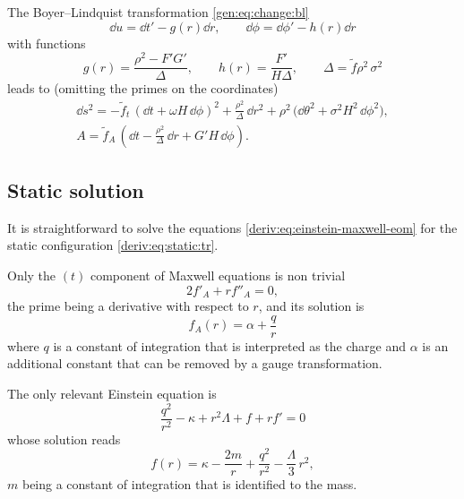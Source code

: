 The Boyer--Lindquist transformation \eqref{gen:eq:change:bl}
\begin{equation}
	\dd u = \dd t' - g(r) \dd r, \qquad
	\dd \phi = \dd \phi' - h(r) \dd r
\end{equation} 
with functions
\begin{equation}
	g(r) = \frac{\rho^2 - F' G'}{\Delta}, \qquad
	h(r) = \frac{F'}{H \Delta}, \qquad
	\Delta = \tilde f \rho^2\, \sigma^2
\end{equation} 
leads to (omitting the primes on the coordinates)
\begin{subequations}
\label{deriv:eq:rotating:tr}
\begin{gather}
	\dd s^2 = - \tilde f_t\, (\dd t + \omega H\, \dd\phi )^2
		+ \frac{\rho^2}{\Delta}\, \dd r^2
		+ \rho^2\, \big(\dd\theta^2 + \sigma^2 H^2\, \dd\phi^2 \big), \\
	A = \tilde f_A\, \left(\dd t - \frac{\rho^2}{\Delta}\, \dd r + G' H\, \dd \phi \right).
\end{gather}
\end{subequations}


\subsection{Static solution}


It is straightforward to solve the equations \eqref{deriv:eq:einstein-maxwell-eom} for the static configuration \eqref{deriv:eq:static:tr}.

Only the $(t)$ component of Maxwell equations is non trivial
\begin{equation}
	2 f'_A + r f''_A = 0,
\end{equation} 
the prime being a derivative with respect to $r$, and its solution is
\begin{equation}
	f_A(r) = \alpha + \frac{q}{r}
\end{equation} 
where $q$ is a constant of integration that is interpreted as the charge and $\alpha$ is an additional constant that can be removed by a gauge transformation.

The only relevant Einstein equation is
\begin{equation}
	\frac{q^2}{r^2} - \kappa + r^2 \Lambda + f + r f' = 0
\end{equation} 
whose solution reads
\begin{equation}
	\label{eq:topdown-1:static-f}
	f(r) = \kappa - \frac{2m}{r} + \frac{q^2}{r^2} - \frac{\Lambda}{3}\, r^2,
\end{equation} 
$m$ being a constant of integration that is identified to the mass.

